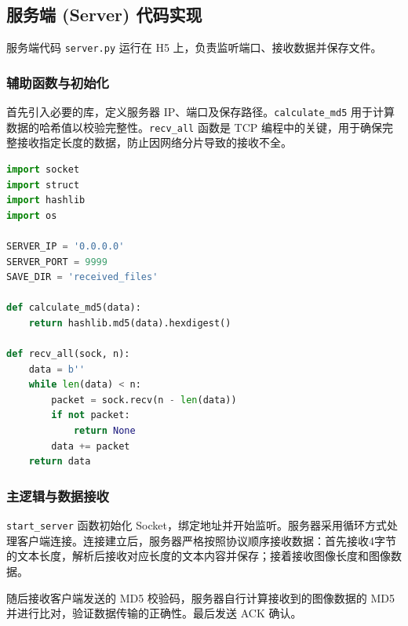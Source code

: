 \documentclass[a4paper]{article}
\begin{document}
\subsection{服务端 (Server) 代码实现}
服务端代码 \texttt{server.py} 运行在 H5 上，负责监听端口、接收数据并保存文件。

\subsubsection{辅助函数与初始化}
首先引入必要的库，定义服务器 IP、端口及保存路径。\texttt{calculate\_md5} 用于计算数据的哈希值以校验完整性。\texttt{recv\_all} 函数是 TCP 编程中的关键，用于确保完整接收指定长度的数据，防止因网络分片导致的接收不全。

\begin{lstlisting}[language=Python, caption={server.py: 辅助函数}]
import socket
import struct
import hashlib
import os

SERVER_IP = '0.0.0.0'
SERVER_PORT = 9999
SAVE_DIR = 'received_files'

def calculate_md5(data):
    return hashlib.md5(data).hexdigest()

def recv_all(sock, n):
    data = b''
    while len(data) < n:
        packet = sock.recv(n - len(data))
        if not packet:
            return None
        data += packet
    return data
\end{lstlisting}

\subsubsection{主逻辑与数据接收}
\texttt{start\_server} 函数初始化 Socket，绑定地址并开始监听。服务器采用循环方式处理客户端连接。连接建立后，服务器严格按照协议顺序接收数据：首先接收4字节的文本长度，解析后接收对应长度的文本内容并保存；接着接收图像长度和图像数据。

随后接收客户端发送的 MD5 校验码，服务器自行计算接收到的图像数据的 MD5 并进行比对，验证数据传输的正确性。最后发送 ACK 确认。
\end{document}
